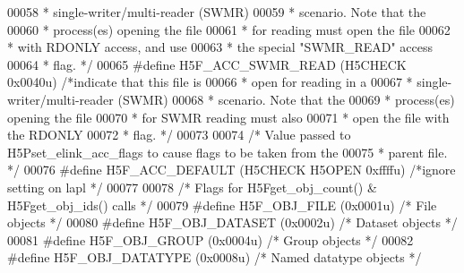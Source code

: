 \begin{DoxyCode}
00058 \textcolor{comment}{                                                 * single-writer/multi-reader (SWMR)}
00059 \textcolor{comment}{                                                 * scenario.  Note that the}
00060 \textcolor{comment}{                                                 * process(es) opening the file}
00061 \textcolor{comment}{                                                 * for reading must open the file}
00062 \textcolor{comment}{                                                 * with RDONLY access, and use}
00063 \textcolor{comment}{                                                 * the special "SWMR\_READ" access}
00064 \textcolor{comment}{                                                 * flag. */}\textcolor{preprocessor}{}
00065 \textcolor{preprocessor}{#define H5F\_ACC\_SWMR\_READ   (H5CHECK 0x0040u) }\textcolor{comment}{/*indicate that this file is}
00066 \textcolor{comment}{                                                 * open for reading in a}
00067 \textcolor{comment}{                                                 * single-writer/multi-reader (SWMR)}
00068 \textcolor{comment}{                                                 * scenario.  Note that the}
00069 \textcolor{comment}{                                                 * process(es) opening the file}
00070 \textcolor{comment}{                                                 * for SWMR reading must also}
00071 \textcolor{comment}{                                                 * open the file with the RDONLY}
00072 \textcolor{comment}{                                                 * flag.  */}\textcolor{preprocessor}{}
00073 
00074 \textcolor{comment}{/* Value passed to H5Pset\_elink\_acc\_flags to cause flags to be taken from the}
00075 \textcolor{comment}{ * parent file. */}
00076 \textcolor{preprocessor}{#define H5F\_ACC\_DEFAULT (H5CHECK H5OPEN 0xffffu)    }\textcolor{comment}{/*ignore setting on lapl     */}\textcolor{preprocessor}{}
00077 
00078 \textcolor{comment}{/* Flags for H5Fget\_obj\_count() & H5Fget\_obj\_ids() calls */}
00079 \textcolor{preprocessor}{#define H5F\_OBJ\_FILE    (0x0001u)       }\textcolor{comment}{/* File objects */}\textcolor{preprocessor}{}
00080 \textcolor{preprocessor}{#define H5F\_OBJ\_DATASET (0x0002u)       }\textcolor{comment}{/* Dataset objects */}\textcolor{preprocessor}{}
00081 \textcolor{preprocessor}{#define H5F\_OBJ\_GROUP   (0x0004u)       }\textcolor{comment}{/* Group objects */}\textcolor{preprocessor}{}
00082 \textcolor{preprocessor}{#define H5F\_OBJ\_DATATYPE (0x0008u)      }\textcolor{comment}{/* Named datatype objects */}\textcolor{preprocessor}{}

\end{DoxyCode}

